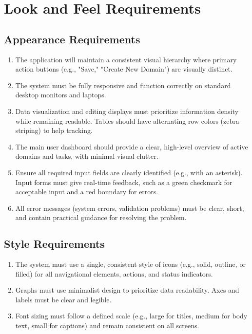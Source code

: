 \documentclass[12pt]{article}
\begin{document}
\section{Look and Feel Requirements}
\subsection{Appearance Requirements}
\begin{enumerate}[label=\thesubsection-\arabic*]
  \item The application will maintain a consistent visual hierarchy where primary action buttons (e.g., "Save," "Create New Domain") are visually distinct.
  \item The system must be fully responsive and function correctly on standard desktop monitors and laptops.
  \item Data visualization and editing displays must prioritize information density while remaining readable. Tables should have alternating row colors (zebra striping) to help tracking.
  \item The main user dashboard should provide a clear, high-level overview of active domains and tasks, with minimal visual clutter.
  \item Ensure all required input fields are clearly identified (e.g., with an asterisk). Input forms must give real-time feedback, such as a green checkmark for acceptable input and a red boundary for errors.
  \item All error messages (system errors, validation problems) must be clear, short, and contain practical guidance for resolving the problem.
\end{enumerate}
\subsection{Style Requirements}
\begin{enumerate}[label=\thesubsection-\arabic*]
  \item The system must use a single, consistent style of icons (e.g., solid, outline, or filled) for all navigational elements, actions, and status indicators.
  \item Graphs must use minimalist design to prioritize data readability. Axes and labels must be clear and legible.
  \item Font sizing must follow a defined scale (e.g., large for titles, medium for body text, small for captions) and remain consistent on all screens.
\end{enumerate}
\end{document}
